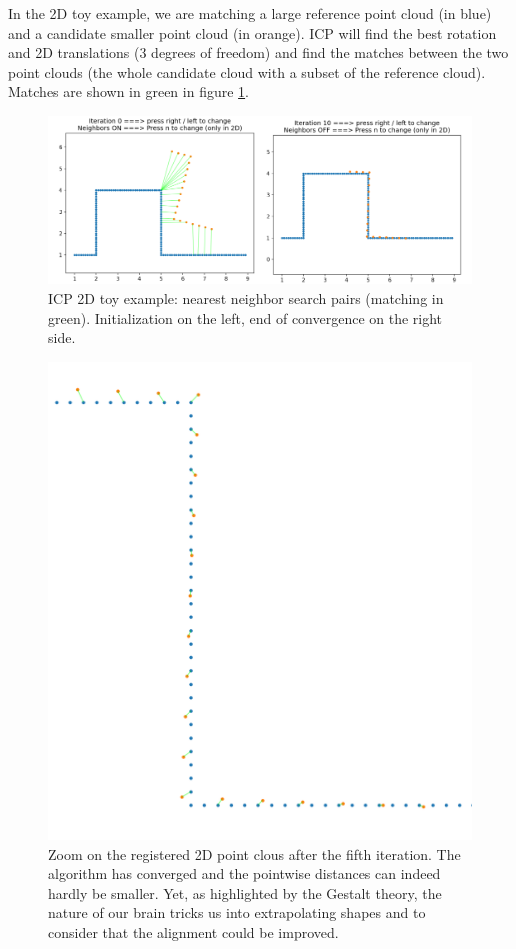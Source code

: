 \documentclass[a4paper]{article}
\begin{document}
In the 2D toy example, we are matching a large reference point cloud (in blue) and a candidate smaller point cloud (in orange). 
ICP will find the best rotation and 2D translations (3 degrees of freedom) and find the matches between the two point clouds (the whole candidate cloud with a subset of the reference cloud).
Matches are shown in green in figure \ref{fig:icp_toy}.

\begin{figure}[ht]
  \centering
  \includegraphics[width=0.8\linewidth]{figures/icp_convergence.png}
  \caption{ICP 2D toy example: nearest neighbor search pairs (matching in green). Initialization on the left, end of convergence on the right side.}
  \label{fig:icp_toy}
\end{figure}

\begin{figure}[ht]
  \centering
  \includegraphics[width=0.4\linewidth]{figures/icp_2d_toy_example_zoom.png}
  \caption{Zoom on the registered 2D point clous after the fifth iteration. The algorithm has converged and the pointwise distances can indeed hardly be smaller. Yet, as highlighted by the Gestalt theory, the nature of our brain tricks us into extrapolating shapes and to consider that the alignment could be improved.}
  \label{fig:icp_toy_convergence_zoom}
\end{figure}

\pagebreak
\end{document}
